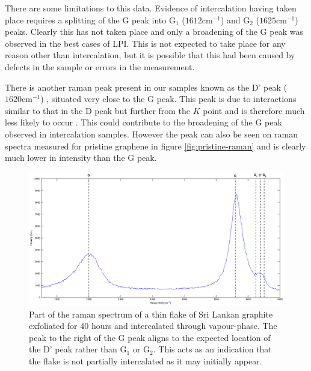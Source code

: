 \documentclass[12pt,titlepage]{article}
\begin{document}
	There are some limitations to this data. Evidence of intercalation having taken place requires a splitting of the G peak into G$_1$ ($1612\text{cm}^{-1}$) and G$_2$ ($1625\text{cm}^{-1}$) peaks. Clearly this has not taken place and only a broadening of the G peak was observed in the best cases of LPI. This is not expected to take place for any reason other than intercalation, but it is possible that this had been caused by defects in the sample or errors in the measurement.
	
	There is another raman peak present in our samples known as the D' peak ($1620\text{cm}^{-1}$) \cite{Vidano1981}, situated very close to the G peak. This peak is due to interactions similar to that in the D peak but further from the $K$ point and is therefore much less likely to occur \cite{Thomsen2000}. This could contribute to the broadening of the G peak observed in intercalation samples. However the peak can also be seen on raman spectra measured for pristine graphene in figure \ref{fig:pristine-raman} and is clearly much lower in intensity than the G peak.
	
	\begin{figure}
		\centering
		\includegraphics[width=1\textwidth]{figures/d-prime.eps}
		\caption[Analysis of the D' raman peak.]{Part of the raman spectrum of a thin flake of Sri Lankan graphite exfoliated for 40 hours and intercalated through vapour-phase. The peak to the right of the G peak aligns to the expected location of the D' peak rather than G$_1$ or G$_2$. This acts as an indication that the flake is not partially intercalated as it may initially appear.}
		\label{fig:d-prime}
	\end{figure}
	
\end{document}
